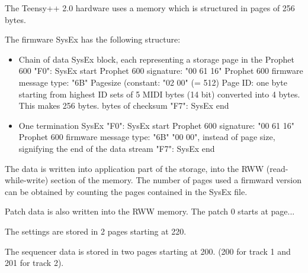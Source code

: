 The Teensy++ 2.0 hardware uses a memory which is structured in pages of 256 bytes.

The firmware SysEx has the following structure:

\begin{itemize}
  \item Chain of data SysEx block, each representing a storage page in the Prophet 600
  \subitem "F0": SysEx start
  \subitem Prophet 600 signature: "00 61 16"
  \subitem Prophet 600 firmware message type: "6B"
  \subitem Pagesize (constant: "02 00" (= 512)
  \subitem Page ID: one byte starting from highest ID
   sets of 5 MIDI bytes (14 bit) converted into 4 bytes. This makes 256 bytes.
   bytes of checksum
  \subitem "F7": SysEx end
  \item One termination SysEx
  \subitem "F0": SysEx start
  \subitem Prophet 600 signature: "00 61 16"
  \subitem Prophet 600 firmware message type: "6B"
  \subitem "00 00", instead of page size, signifying the end of the data stream
  \subitem "F7": SysEx end  
\end{itemize}

The data is written into application part of the storage, into the RWW (read-while-write) section of the memory. The number of pages used a firmward version can be obtained by counting the pages contained in the SysEx file.

Patch data is also written into the RWW memory. The patch 0 starts at page...

The settings are stored in 2 pages starting at 220.

The sequencer data is stored in two pages starting at 200. (200 for track 1 and 201 for track 2).
